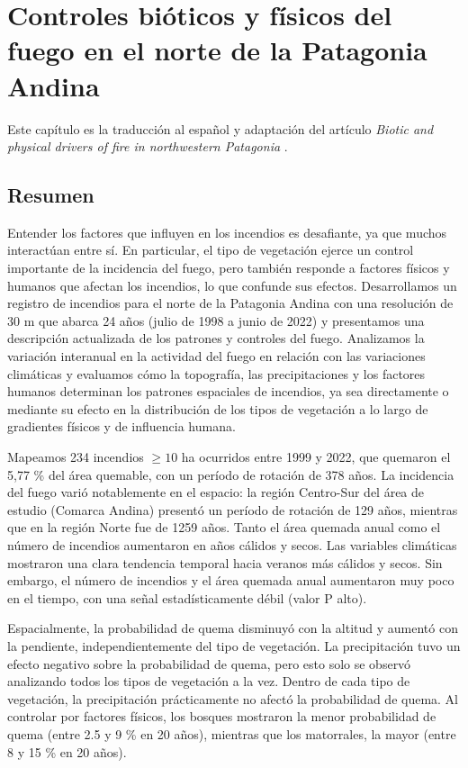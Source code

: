 \newpage{\ }
\cleardoublepage

\chapter[Capítulo 3. Controles bióticos y físicos del fuego en el norte de la Patagonia Andina]{Controles bióticos y físicos del fuego en el norte de la Patagonia Andina}\label{cap:patrones}

\noindent Este capítulo es la traducción al español y adaptación del artículo \textit{Biotic and physical drivers of fire in northwestern Patagonia} \citep{barbera_patterns}.

\section*{Resumen}

Entender los factores que influyen en los incendios es desafiante, ya que muchos interactúan entre sí. En particular, el tipo de vegetación ejerce un control importante de la incidencia del fuego, pero también responde a factores físicos y humanos que afectan los incendios, lo que confunde sus efectos. Desarrollamos un registro de incendios para el norte de la Patagonia Andina con una resolución de 30 m que abarca 24 años (julio de 1998 a junio de 2022) y presentamos una descripción actualizada de los patrones y controles del fuego. Analizamos la variación interanual en la actividad del fuego en relación con las variaciones climáticas y evaluamos cómo la topografía, las precipitaciones y los factores humanos determinan los patrones espaciales de incendios, ya sea directamente o mediante su efecto en la distribución de los tipos de vegetación a lo largo de gradientes físicos y de influencia humana.

Mapeamos 234 incendios $\ge 10$ ha ocurridos entre 1999 y 2022, que quemaron el 5,77 \% del área quemable, con un período de rotación de 378 años. La incidencia del fuego varió notablemente en el espacio: la región Centro-Sur del área de estudio (Comarca Andina) presentó un período de rotación de 129 años, mientras que en la región Norte fue de 1259 años. Tanto el área quemada anual como el número de incendios aumentaron en años cálidos y secos. Las variables climáticas mostraron una clara tendencia temporal hacia veranos más cálidos y secos. Sin embargo, el número de incendios y el área quemada anual aumentaron muy poco en el tiempo, con una señal estadísticamente débil (valor P alto).

Espacialmente, la probabilidad de quema disminuyó con la altitud y aumentó con la pendiente, independientemente del tipo de vegetación. La precipitación tuvo un efecto negativo sobre la probabilidad de quema, pero esto solo se observó analizando todos los tipos de vegetación a la vez. Dentro de cada tipo de vegetación, la precipitación prácticamente no afectó la probabilidad de quema. Al controlar por factores físicos, los bosques mostraron la menor probabilidad de quema (entre 2.5 y 9 \% en 20 años), mientras que los matorrales, la mayor (entre 8 y 15 \% en 20 años).

